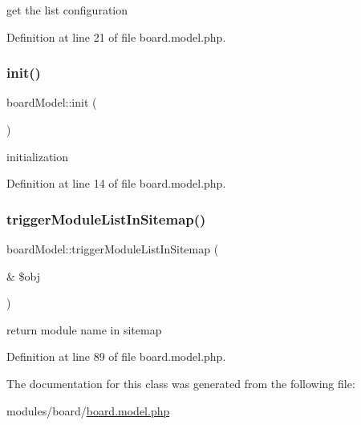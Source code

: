 get the list configuration 



Definition at line 21 of file board.\+model.\+php.

\mbox{\label{classboardModel_a6195c2c2de16e5fee06e360aba66055a}} 
\subsubsection{\texorpdfstring{init()}{init()}}
{\footnotesize\ttfamily board\+Model\+::init (\begin{DoxyParamCaption}{ }\end{DoxyParamCaption})}



initialization 



Definition at line 14 of file board.\+model.\+php.

\mbox{\label{classboardModel_a1960d5d832bbe3464065ec3c1ffce947}} 
\subsubsection{\texorpdfstring{trigger\+Module\+List\+In\+Sitemap()}{triggerModuleListInSitemap()}}
{\footnotesize\ttfamily board\+Model\+::trigger\+Module\+List\+In\+Sitemap (\begin{DoxyParamCaption}\item[{\&}]{\$obj }\end{DoxyParamCaption})}



return module name in sitemap 



Definition at line 89 of file board.\+model.\+php.



The documentation for this class was generated from the following file\+:\begin{DoxyCompactItemize}
\item 
modules/board/\hyperlink{board_8model_8php}{board.\+model.\+php}\end{DoxyCompactItemize}
